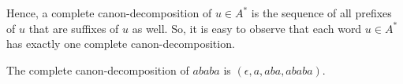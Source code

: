 Hence, a complete canon-decomposition of $u\in A^*$ is the sequence of all prefixes of $u$ that are suffixes of $u$ as well. So, it is easy to observe that each word $u\in A^*$ has exactly one complete canon-decomposition.


\begin{example}
	The  complete canon-decomposition of $ababa$ is $(\epsilon, a, aba, ababa)$.
\end{example}

%


